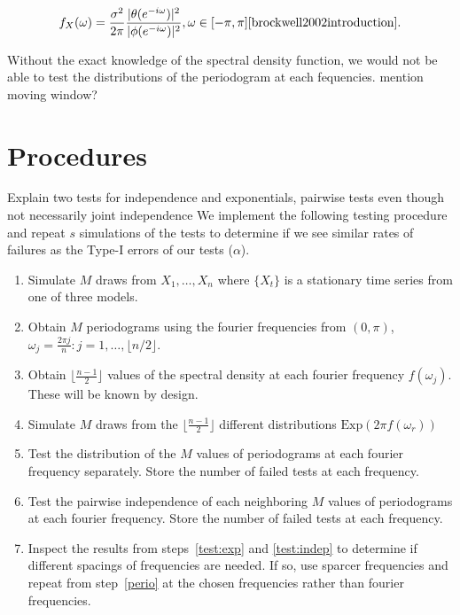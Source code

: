 \documentclass{article}\usepackage{graphicx, color}
\newcommand{\mj}[1]{{\color{blue} #1}}
\theoremstyle{plain}
\begin{document}
\begin{align*}
f_X(\omega) = \frac{\sigma^2}{2\pi} \frac{|\theta(e^{-i \omega})|^2}{|\phi(e^{-i \omega})|^2}, \omega \in [-\pi, \pi] \text{\cite{brockwell2002introduction}}.
\end{align*}

Without the exact knowledge of the spectral density function, we would not be able to test the distributions of the periodogram at each fequencies. \mj{mention moving window?}


\section{Procedures}

\mj{Explain two tests for independence and exponentials, pairwise tests even though not necessarily joint independence}
We implement the following testing procedure and repeat $s$ simulations of the tests to determine if we see similar rates of failures as the Type-I errors of our tests ($\alpha$).

\begin{enumerate}
\item Simulate $M$ draws from $X_1,\dots, X_n$ where $\{X_t\}$ is a stationary time series from one of three models.
\item \label{perio}Obtain $M$ periodograms using the fourier frequencies from $(0, \pi)$, $\omega_j = \frac{2\pi j}{n}: j = 1, \dots, \lfloor n/2 \rfloor$.
\item Obtain $\lfloor\frac{n-1}{2}\rfloor$ values of the spectral density at each fourier frequency $f(\omega_j)$. These will be known by design.
\item Simulate $M$ draws from the $\lfloor\frac{n-1}{2}\rfloor$ different distributions $\text{Exp}(2\pi f(\omega_r))$
\item \label{test:exp}Test the distribution of the $M$ values of periodograms at each fourier frequency separately. Store the number of failed tests at each frequency.
\item \label{test:indep}Test the pairwise independence of each neighboring $M$ values of periodograms at each fourier frequency. Store the number of failed tests at each frequency.
\item Inspect the results from steps~\ref{test:exp} and \ref{test:indep} to determine if different spacings of frequencies are needed. If so, use sparcer frequencies and repeat from step~\ref{perio} at the chosen frequencies rather than fourier frequencies.
\end{enumerate}
\end{document}

